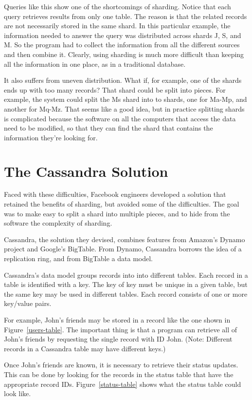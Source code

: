 Queries like this show one of the shortcomings of sharding.  
Notice that each query retrieves results from only one table.  
The reason is that the related records are not necessarily stored in the same shard.  
In this particular example, the information needed to answer the query was 
distributed across shards J, S, and M.  
So the program had to collect the information from all the different sources and then combine it.  
Clearly, using sharding is much more difficult than keeping all the information in one place,
as in a traditional database.

It also suffers from uneven distribution.  
What if, for example, one of the shards ends up with too many records?
That shard could be split into pieces.
For example, the system could
split the Ms shard into to shards, one for Ma-Mp, and another for Mq-Mz.  
That seems like a good idea, but in practice splitting shards
is complicated because the software on all the computers that access the data
need to be modified, so that they can find the shard that contains the information they're looking for.

\section{The Cassandra Solution}

Faced with these difficulties, Facebook engineers developed a solution that  
retained the benefits of sharding, but avoided some of the difficulties.  
The goal was to make easy to split a shard into multiple pieces, 
and to hide from the software the complexity of sharding.

Cassandra, the solution they devised, combines features from Amazon's Dynamo project and Google's BigTable.  From Dynamo, Cassandra borrows the idea of a replication ring, 
and from BigTable a data model.

Cassandra's data model groups records into into different tables.  
Each record in a table is identified with a key.  
The key of key must be unique in a given table, but the same key may be used in different tables.
Each record consists of one or more key/value pairs.

For example, John's friends may be stored in a record like the one shown in Figure~\ref{users-table}.
The important thing is that a program can retrieve 
all of John's friends by requesting the single record with ID John.  
(Note: Different records in a Cassandra table may have different keys.)

Once John's friends are known, it is necessary to retrieve their status updates.  
This can be done by looking for the records in the status table that have the appropriate record IDs.  Figure~\ref{status-table} shows what the status table could look like.

